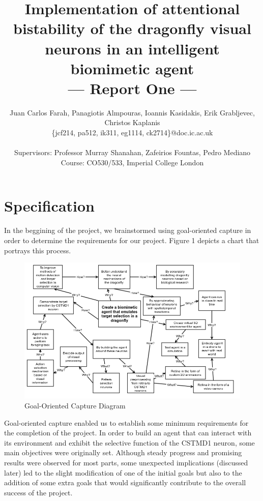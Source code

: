 \documentclass[a4paper,11pt]{article}
\title{Implementation of attentional bistability of the dragonfly visual neurons in an intelligent biomimetic agent\\\Large{--- Report One ---}}
\author{Juan Carlos Farah, Panagiotis Almpouras, Ioannis Kasidakis, Erik Grabljevec, Christos Kaplanis\\
       \{jcf214, pa512, ik311, eg1114, ck2714\}@doc.ic.ac.uk\\ \\
       \small{Supervisors: Professor Murray Shanahan, Zafeirios Fountas, Pedro Mediano}\\
       \small{Course: CO530/533, Imperial College London}
}
\begin{document}
\maketitle

\section{Specification}
In the beggining of the project, we brainstormed using goal-oriented capture in order to determine the requirements for our project. Figure 1 depicts a chart that portrays this process.	
		
	
	\begin{figure}
	\begin{center}
	\includegraphics[scale = 0.5]{goalorient}
	\end{center}
	\caption{Goal-Oriented Capture Diagram}
	\end{figure}	
	


	
	Goal-oriented capture enabled us to establish some minimum requirements for the completion of the project. In order to build an agent that can interact with its environment and exhibit the selective function of the CSTMD1 neuron, some main objectives were originally set. Although steady progress and promising results were observed for most parts, some unexpected implications (discussed later) led to the slight modification of one of the initial goals but also to the addition of some extra goals that would significantly contribute to the overall success of the project.
\end{document}
